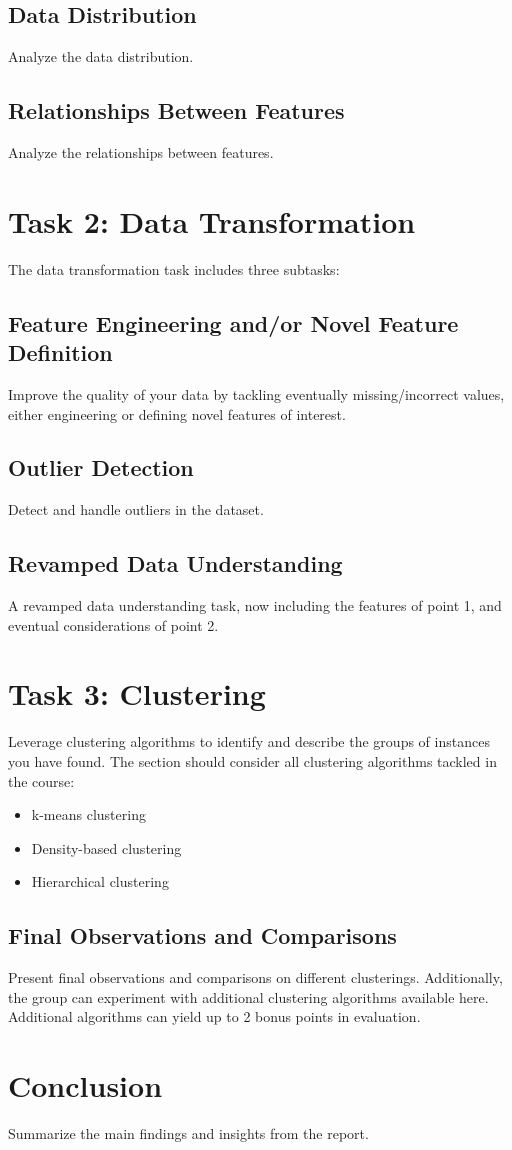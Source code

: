 \documentclass[a4paper,12pt]{article}
\begin{document}
\subsection{Data Distribution}
Analyze the data distribution.

\subsection{Relationships Between Features}
Analyze the relationships between features.

\section{Task 2: Data Transformation}
\label{sec:task2}
The data transformation task includes three subtasks:

\subsection{Feature Engineering and/or Novel Feature Definition}
Improve the quality of your data by tackling eventually missing/incorrect values, either engineering or defining novel features of interest.

\subsection{Outlier Detection}
Detect and handle outliers in the dataset.

\subsection{Revamped Data Understanding}
A revamped data understanding task, now including the features of point 1, and eventual considerations of point 2.

\section{Task 3: Clustering}
\label{sec:task3}
Leverage clustering algorithms to identify and describe the groups of instances you have found. The section should consider all clustering algorithms tackled in the course:
\begin{itemize}
    \item k-means clustering
    \item Density-based clustering
    \item Hierarchical clustering
\end{itemize}

\subsection{Final Observations and Comparisons}
Present final observations and comparisons on different clusterings. Additionally, the group can experiment with additional clustering algorithms available here. Additional algorithms can yield up to 2 bonus points in evaluation.

\section{Conclusion}
\label{sec:conclusion}
Summarize the main findings and insights from the report.
\end{document}
